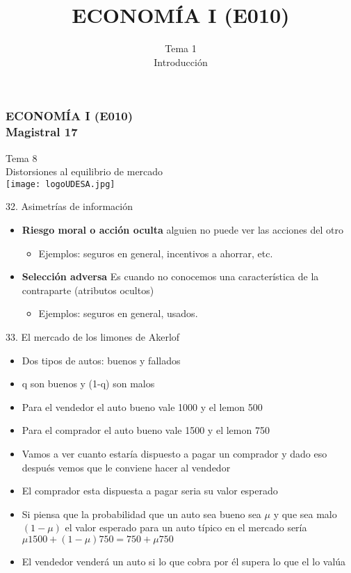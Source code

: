 \documentclass[14pt]{beamer}
\title{ECONOM\'{I}A I (E010)}
\subtitle{Tema 1 \\ Introducción}
\begin{document}
\begin{frame}
\frametitle{ECONOM\'{I}A I (E010) \\ \vspace{12mm} Magistral 17}
\centering
Tema 8 \\ Distorsiones al equilibrio de mercado \\ \vspace{4mm}
\texttt{[image: logoUDESA.jpg]} 
\end{frame}

\begin{frame}{32. Asimetrías de información}
    \begin{itemize}
        \item \textbf{Riesgo moral o acción oculta} alguien no puede ver las acciones del otro
            \begin{itemize}
            \item Ejemplos: seguros en general, incentivos a ahorrar, etc. 
            \end{itemize}
        \item \textbf{Selección adversa} Es cuando no conocemos una característica de la contraparte (atributos ocultos)
            \begin{itemize}
            \item Ejemplos: seguros en general, usados. 
            \end{itemize}
    \end{itemize}
    \end{frame}
    
\begin{frame}{33. El mercado de los limones de Akerlof}
\begin{itemize}
    \item Dos tipos de autos: buenos y fallados
    \item q son buenos y (1-q) son malos 
    \item Para el vendedor el auto bueno vale 1000 y el lemon 500 
    \item Para el comprador el auto bueno vale 1500 y el lemon 750 
    \item Vamos a ver cuanto estaría dispuesto a pagar un comprador y dado eso después vemos que le conviene hacer al vendedor
    \item El comprador esta dispuesta a pagar seria su valor esperado
    \item Si piensa que la probabilidad que un auto sea bueno sea  $\mu$ y que sea malo  $(1-\mu)$ el valor esperado para un auto típico en el mercado sería  $\mu 1500 + (1-\mu) 750= 750 + \mu 750$ 
    \item El vendedor venderá un auto si lo que cobra por él supera lo que el lo valúa
\end{itemize}
\end{frame}
\end{document}
